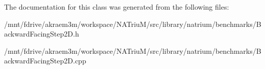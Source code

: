 The documentation for this class was generated from the following files:\begin{DoxyCompactItemize}
\item 
/mnt/fdrive/akraem3m/workspace/NATriuM/src/library/natrium/benchmarks/BackwardFacingStep2D.h\item 
/mnt/fdrive/akraem3m/workspace/NATriuM/src/library/natrium/benchmarks/BackwardFacingStep2D.cpp\end{DoxyCompactItemize}
